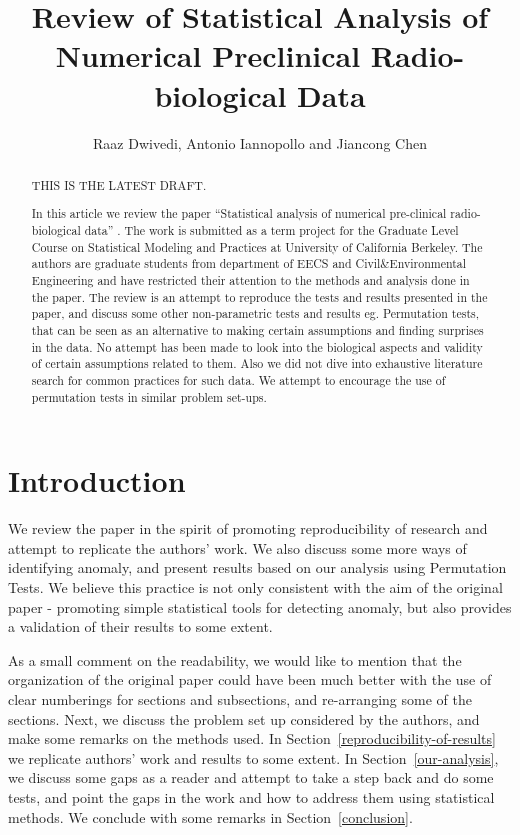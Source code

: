 \documentclass{article}
\title{Review of Statistical Analysis of Numerical Preclinical Radio-biological Data}
\author{Raaz Dwivedi,  Antonio Iannopollo and Jiancong Chen}
\begin{document}
    \maketitle



\begin{abstract}
THIS IS THE LATEST DRAFT.

In this article we review the paper ``Statistical analysis of numerical
pre-clinical radio-biological data'' \cite{pitt2016statistical}. The work is submitted as a term
project for the Graduate Level Course on Statistical Modeling and
Practices at University of California Berkeley. The authors are graduate
students from department of EECS and Civil\&Environmental Engineering
and have restricted their attention to the methods and analysis done in
the paper. The review is an attempt to reproduce the tests and results
presented in the paper, and discuss some other non-parametric tests and
results eg. Permutation tests, that can be seen as an alternative to
making certain assumptions and finding surprises in the data. No attempt
has been made to look into the biological aspects and validity of
certain assumptions related to them. Also we did not dive into exhaustive literature search for common practices for such data. We attempt to encourage the use of permutation tests in similar problem set-ups.
\end{abstract}

\section{Introduction} %
\label{sec:introduction}


We review the paper in the spirit of promoting reproducibility of research and attempt to replicate the authors' work. We also discuss some more ways of identifying anomaly, and present results based on our analysis using Permutation Tests. We believe this practice is not only consistent with the aim of the original paper - promoting simple statistical tools for detecting anomaly, but also provides a validation of their results to some extent.

As a small comment on the readability, we would like to mention that the organization of the original paper could have been much better with the use of clear numberings for sections and subsections, and re-arranging some of the sections. Next, we discuss the problem set up considered by the authors, and make some remarks on the methods used. In Section~\ref{reproducibility-of-results} we replicate authors' work and results to some extent. In Section~\ref{our-analysis}, we discuss some gaps as a reader and attempt to take a step back and do some tests, and point the gaps in the work and how to address them using statistical methods. We conclude with some remarks in Section~\ref{conclusion}.
\end{document}
